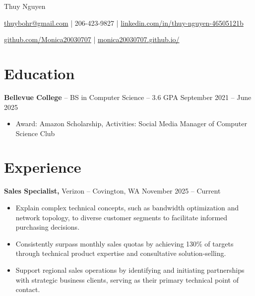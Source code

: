 \documentclass[11pt]{article}       %
\begin{document}
\centerline{\Huge Thuy Nguyen}

\vspace{5pt}

\centerline{\href{mailto:thuybohr@gmail.com}{thuybohr@gmail.com} | 206-423-9827 |
\href{https://www.linkedin.com/in/thuy-nguyen-46505121b/}{linkedin.com/in/thuy-nguyen-46505121b}}

\centerline{\href{https://github.com/Monica20030707}{github.com/Monica20030707} | 
\href{https://monica20030707.github.io/}{monica20030707.github.io/}} 

\vspace{-9pt}

\section*{Education}
\textbf{Bellevue College} -- BS in Computer Science -- 3.6 GPA \hfill September 2021 -- June 2025\\
\vspace{-9pt}
\begin{itemize}
  \item Award: Amazon Scholarship, Activities: Social Media Manager of Computer Science Club
\end{itemize}

\vspace{-18.5pt}

\section*{Experience}

\textbf{Sales Specialist,} {Verizon} -- Covington, WA \hfill November 2025 -- Current \\
\vspace{-9pt}
\begin{itemize}
  \item Explain complex technical concepts, such as bandwidth optimization and network topology, to diverse customer segments to facilitate informed purchasing decisions.
  \item Consistently surpass monthly sales quotas by achieving 130\% of targets through technical product expertise and consultative solution-selling.
  \item Support regional sales operations by identifying and initiating partnerships with strategic business clients, serving as their primary technical point of contact.
\end{itemize}
\end{document}
